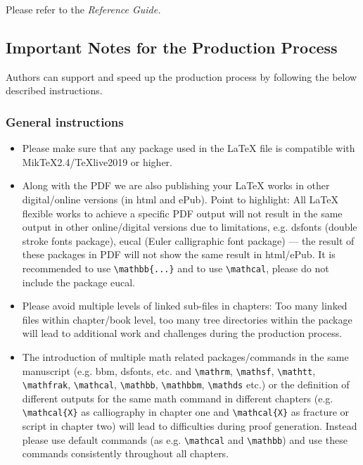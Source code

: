 \documentclass[graybox]{svmono}
\begin{document}
\noindent
Please refer to the {\it Reference Guide.}

\subsection{Important Notes for the Production Process}

Authors can support and speed up the production process by following the below described instructions.

\eject

\subsubsection*{General instructions}

\begin{itemize}
\item Please make sure that any package used in the LaTeX file is compatible with MikTeX2.4/TeXlive2019 or higher.

\item Along with the PDF we are also publishing your LaTeX works in other digital/online versions (in html and ePub). Point to highlight: All LaTeX flexible works to achieve a specific PDF output will not result in the same output in other online/digital versions due to limitations, e.g. dsfonts (double stroke fonts package), eucal (Euler calligraphic font package) --- the result of these packages in PDF will not show the same result in html/ePub. It is recommended to use \verb|\mathbb{...}| and to use \verb|\mathcal|, please do not include the package eucal.

\item Please avoid multiple levels of linked sub-files in chapters: Too many linked files within chapter/book level, too many tree directories within the package will lead to additional work and challenges during the production process.

\item The introduction of multiple math related packages/commands in the same manuscript (e.g. bbm, dsfonts, etc. and \verb|\mathrm|, \verb|\mathsf|, \verb|\mathtt|, \verb|\mathfrak|, \verb|\mathcal|, \verb|\mathbb|, \verb|\mathbbm|, \verb|\mathds| etc.) or the definition of different outputs for the same math command in different chapters (e.g. \verb|\mathcal{X}| as calliography in chapter one and \verb|\mathcal{X}| as fracture or script in chapter two) will lead to difficulties during proof generation. Instead please use default commands (as e.g. \verb|\mathcal| and \verb|\mathbb|) and use these commands consistently throughout all chapters.


\end{itemize}
\end{document}
